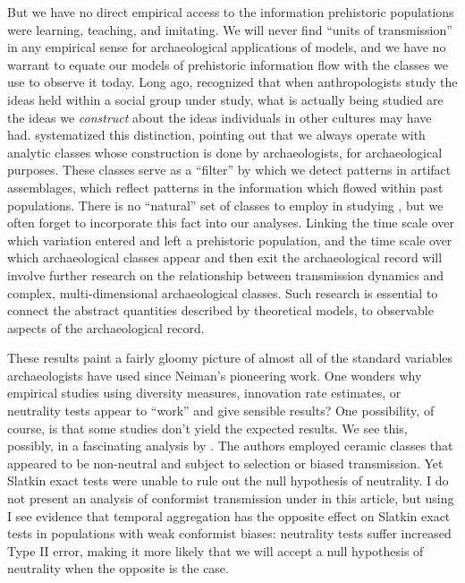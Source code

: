 But we have no direct empirical access to the information prehistoric populations were learning, teaching, and imitating.  We will never find ``units of transmission'' in any empirical sense for archaeological applications of \ct models, and we have no warrant to equate our models of prehistoric information flow with the classes we use to observe it today.  Long ago, \citet{8874} recognized that when anthropologists study the ideas held within a social group under study, what is actually being studied are the ideas we \emph{construct} about the ideas individuals in other cultures may have had.  \citet{Dunnell1971} systematized this distinction, pointing out that we always operate with analytic classes whose construction is done by archaeologists, for archaeological purposes.  These classes serve as a ``filter'' by which we detect patterns in artifact assemblages, which reflect patterns in the information which flowed within past populations.  There is no ``natural'' set of classes to employ in studying \ct, but we often forget to incorporate this fact into our analyses.  Linking the time scale over which variation entered and left a prehistoric population, and the time scale over which archaeological classes appear and then exit the archaeological record will involve further research on the relationship between transmission dynamics and complex, multi-dimensional archaeological classes.  Such research is essential to connect the abstract quantities described by theoretical models, to observable aspects of the archaeological record.  

These results paint a fairly gloomy picture of almost all of the standard variables archaeologists have used since Neiman's \citeyearpar{Neiman1995} pioneering work.  One wonders why empirical studies using diversity measures, innovation rate estimates, or neutrality tests appear to ``work'' and give sensible results?  One possibility, of course, is that some studies don't yield the expected results.  We see this, possibly, in a fascinating analysis by \citet{steele2010ceramic}.  The authors employed ceramic classes that appeared to be non-neutral and subject to selection or biased transmission.  Yet Slatkin exact tests were unable to rule out the null hypothesis of neutrality.  I do not present an analysis of conformist transmission under \timeav in this article, but using \tf I see evidence that temporal aggregation has the opposite effect on Slatkin exact tests in populations with weak conformist biases:  neutrality tests suffer increased Type II error, making it more likely that we will accept a null hypothesis of neutrality when the opposite is the case.  

